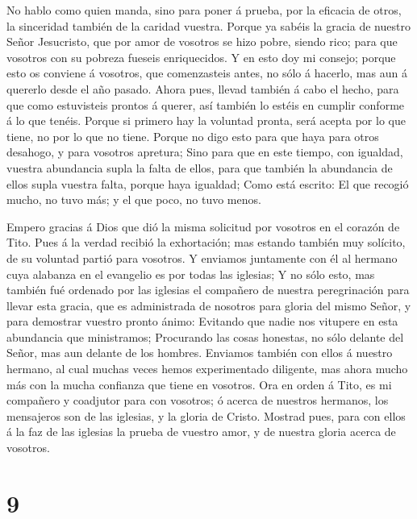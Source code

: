  No hablo como quien manda, sino para poner á prueba, por la
eficacia de otros, la sinceridad también de la caridad vuestra.
 Porque ya sabéis la gracia de nuestro Señor Jesucristo, que
por amor de vosotros se hizo pobre, siendo rico; para que vosotros con
su pobreza fueseis enriquecidos.  Y en esto doy mi consejo;
porque esto os conviene á vosotros, que comenzasteis antes, no sólo á
hacerlo, mas aun á quererlo desde el año pasado.  Ahora
pues, llevad también á cabo el hecho, para que como estuvisteis prontos
á querer, así también lo estéis en cumplir conforme á lo que tenéis.
 Porque si primero hay la voluntad pronta, será acepta por
lo que tiene, no por lo que no tiene.  Porque no digo esto
para que haya para otros desahogo, y para vosotros apretura;
 Sino para que en este tiempo, con igualdad, vuestra
abundancia supla la falta de ellos, para que también la abundancia de
ellos supla vuestra falta, porque haya igualdad;  Como está
escrito: El que recogió mucho, no tuvo más; y el que poco, no tuvo
menos.

 Empero gracias á Dios que dió la misma solicitud por
vosotros en el corazón de Tito.  Pues á la verdad recibió
la exhortación; mas estando también muy solícito, de su voluntad partió
para vosotros.  Y enviamos juntamente con él al hermano
cuya alabanza en el evangelio es por todas las iglesias;  Y
no sólo esto, mas también fué ordenado por las iglesias el compañero de
nuestra peregrinación para llevar esta gracia, que es administrada de
nosotros para gloria del mismo Señor, y para demostrar vuestro pronto
ánimo:  Evitando que nadie nos vitupere en esta abundancia
que ministramos;  Procurando las cosas honestas, no sólo
delante del Señor, mas aun delante de los hombres. 
Enviamos también con ellos á nuestro hermano, al cual muchas veces hemos
experimentado diligente, mas ahora mucho más con la mucha confianza que
tiene en vosotros.  Ora en orden á Tito, es mi compañero y
coadjutor para con vosotros; ó acerca de nuestros hermanos, los
mensajeros son de las iglesias, y la gloria de Cristo. 
Mostrad pues, para con ellos á la faz de las iglesias la prueba de
vuestro amor, y de nuestra gloria acerca de vosotros.

\hypertarget{section-8}{%
\section{9}\label{section-8}}

